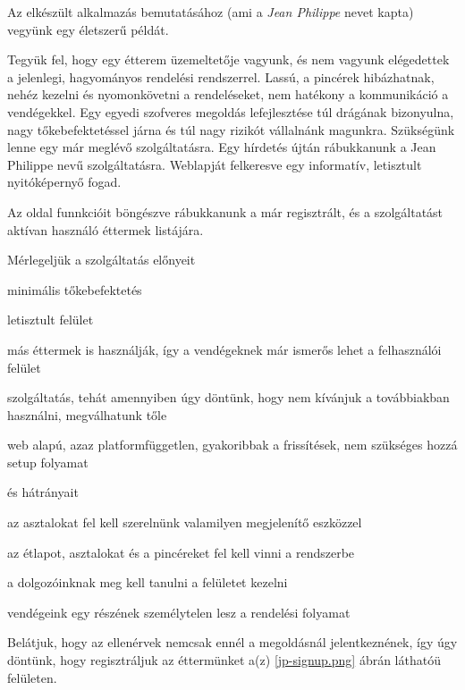 Az elkészült alkalmazás bemutatásához (ami a \emph{Jean Philippe} nevet kapta) vegyünk egy életszerű példát. \par

Tegyük fel, hogy egy étterem üzemeltetője vagyunk, és nem vagyunk elégedettek a jelenlegi, hagyományos rendelési rendszerrel. Lassú, a pincérek hibázhatnak, nehéz kezelni és nyomonkövetni a rendeléseket, nem hatékony a kommunikáció a vendégekkel. Egy egyedi szofveres megoldás lefejlesztése túl drágának bizonyulna, nagy tőkebefektetéssel járna és túl nagy rizikót vállalnánk magunkra. Szükségünk lenne egy már meglévő szolgáltatásra. Egy hírdetés újtán rábukkanunk a Jean Philippe nevű szolgáltatásra. Weblapját felkeresve egy informatív, letisztult nyitóképernyő fogad. 


Az oldal funnkcióit böngészve rábukkanunk a már regisztrált, és a szolgáltatást aktívan használó éttermek listájára.


Mérlegeljük a szolgáltatás előnyeit

\begin{listing}
	\item minimális tőkebefektetés
	\item letisztult felület
	\item más éttermek is használják, így a vendégeknek már ismerős lehet a felhasználói felület
	\item szolgáltatás, tehát amennyiben úgy döntünk, hogy nem kívánjuk a továbbiakban használni, megválhatunk tőle
	\item web alapú, azaz platformfüggetlen, gyakoribbak a frissítések, nem szükséges hozzá setup folyamat
\end{listing}

és hátrányait

\begin{listing}
	\item az asztalokat fel kell szerelnünk valamilyen megjelenítő eszközzel
	\item az étlapot, asztalokat és a pincéreket fel kell vinni a rendszerbe
	\item a dolgozóinknak meg kell tanulni a felületet kezelni
	\item vendégeink egy részének személytelen lesz a rendelési folyamat
\end{listing}

Belátjuk, hogy az ellenérvek nemcsak ennél a megoldásnál jelentkeznének, így úgy döntünk, hogy regisztráljuk az éttermünket a(z) \ref{jp-signup.png} ábrán láthatóü felületen.

